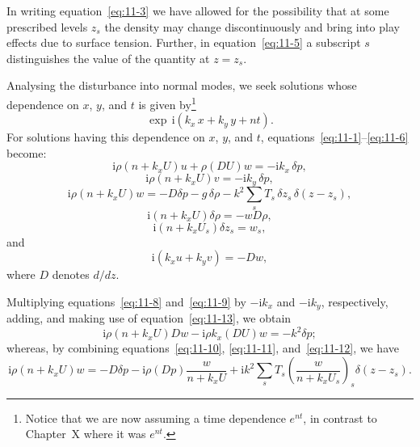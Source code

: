In writing equation~\eqref{eq:11-3} we have allowed for the possibility that at some prescribed levels $z_s$ the density may change discontinuously and bring into play effects due to surface tension. Further, in equation~\eqref{eq:11-5} a subscript $s$ distinguishes the value of the quantity at $z = z_s$.

Analysing the disturbance into normal modes, we seek solutions whose dependence on $x$, $y$, and $t$ is given by\footnote{Notice that we are now assuming a time dependence $e^{nt}$, in contrast to Chapter~X where it was $e^{nt}$.}
\begin{equation}
\label{eq:11-7}
\exp\,\mathrm{i}(k_x\,x+k_y\,y+nt).
\end{equation}
For solutions having this dependence on $x$, $y$, and $t$, equations~\eqref{eq:11-1}--\eqref{eq:11-6} become:
\begin{equation}
\label{eq:11-8}
\mathrm{i}\rho(n+k_x U)u + \rho(DU)w = -\mathrm{i}k_x\,\delta p,
\end{equation}
\begin{equation}
\label{eq:11-9}
\mathrm{i}\rho(n+k_x U)v = -\mathrm{i}k_y\,\delta p,
\end{equation}
\begin{equation}
\label{eq:11-10}
\mathrm{i}\rho(n+k_x U)w = -D\delta p - g\,\delta\rho - k^2\sum_s T_s\,\delta z_s\,\delta(z-z_s),
\end{equation}
\begin{equation}
\label{eq:11-11}
\mathrm{i}(n+k_x U)\delta\rho = -wD\rho,
\end{equation}
\begin{equation}
\label{eq:11-12}
\mathrm{i}(n+k_x U_s)\delta z_s = w_s,
\end{equation}
and
\begin{equation}
\label{eq:11-13}
\mathrm{i}(k_x u+k_y v) = -Dw,
\end{equation}
where $D$ denotes $d/dz$.

Multiplying equations~\eqref{eq:11-8} and~\eqref{eq:11-9} by $-\mathrm{i}k_x$ and $-\mathrm{i}k_y$, respectively, adding, and making use of equation~\eqref{eq:11-13}, we obtain
\begin{equation}
\label{eq:11-14}
\mathrm{i}\rho(n+k_x U)Dw - \mathrm{i}\rho k_x(DU)w = -k^2\delta p;
\end{equation}
whereas, by combining equations~\eqref{eq:11-10}, \eqref{eq:11-11}, and~\eqref{eq:11-12}, we have
\begin{equation}
\label{eq:11-15}
\mathrm{i}\rho(n+k_x U)w = -D\delta p - \mathrm{i}\rho(Dp)\frac{w}{n+k_x U} + \mathrm{i}k^2\sum_s T_s\!\left(\frac{w}{n+k_x U_s}\right)_{\!s}\!\delta(z-z_s).
\end{equation}

